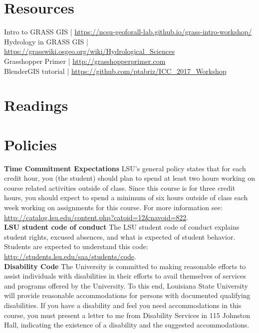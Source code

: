 \documentclass[11pt,article,oneside]{memoir}
\begin{document}
\section{Resources}
Intro to GRASS GIS | \url{https://ncsu-geoforall-lab.github.io/grass-intro-workshop/}\\
Hydrology in GRASS GIS | \url{https://grasswiki.osgeo.org/wiki/Hydrological_Sciences}\\
Grasshopper Primer | \url{http://grasshopperprimer.com}\\
BlenderGIS tutorial | \url{https://github.com/ptabriz/ICC_2017_Workshop}

\section{Readings}
\renewcommand*{\bibfont}{\normalsize} %
\vspace*{0.5cm}
\nocite{*}
\setlength{}
\printbibliography[heading=none]

\clearpage

\section{Policies}

\noindent \textbf{Time Commitment Expectations}
LSU's general policy states that for each credit hour, you (the student) should plan to
spend at least two hours working on course related activities outside of class. Since this course is for three credit hours, you should expect to spend a minimum of six hours outside of class each week working on assignments for this course. For more information see: 
\url{http://catalog.lsu.edu/content.php?catoid=12&navoid=822}.\\

\noindent \textbf{LSU student code of conduct}
The LSU student code of conduct explains student rights, excused absences, and what is expected of student behavior. Students are expected to understand this code:  \url{http://students.lsu.edu/saa/students/code}.\\ %

\noindent \textbf{Disability Code}
The University is committed to making reasonable efforts to assist individuals with disabilities in
their efforts to avail themselves of services and programs offered by the University. To this end,
Louisiana State University will provide reasonable accommodations for persons with
documented qualifying disabilities. If you have a disability and feel you need accommodations in
this course, you must present a letter to me from Disability Services in 115 Johnston Hall,
indicating the existence of a disability and the suggested accommodations.\\
\end{document}
